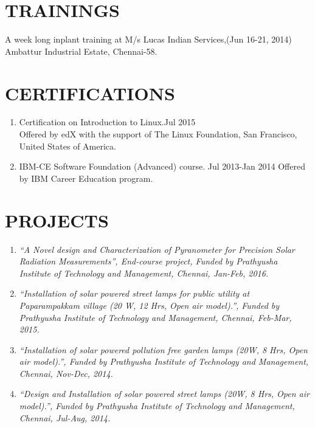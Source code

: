 \documentclass[line,margin,12pt ]{res}
\begin{document}
\begin{resume}

\section{TRAININGS }
A week long inplant training at M/s Lucas Indian Services,\hfill (Jun 16-21, 2014) \newline Ambattur Industrial Estate, Chennai-58. 


\section{CERTIFICATIONS}\vspace*{-0.48 cm}
\begin{enumerate}
    \item	{Certification on \textgravedbl Introduction to Linux.\textacutedbl }\hfill{Jul 2015}\\
Offered by edX with the support of The Linux Foundation, San Francisco, United States of America. 
	 \item {IBM-CE Software Foundation (Advanced) course. \hfill {Jul 2013-Jan 2014}}
\newline Offered by IBM Career Education program.
\end{enumerate}


\section{PROJECTS}\vspace*{-0.48 cm} %
\begin{enumerate}
\item {\sl \textquotedblleft A Novel design and Characterization of Pyranometer for Precision Solar Radiation Measurements\textquotedblright, End-course project, Funded by Prathyusha Institute of Technology and Management, Chennai, Jan-Feb, 2016.}
\item {\sl \textquotedblleft Installation of solar powered street lamps for public utility at Paparampakkam village (20 W, 12 Hrs, Open air model).\textquotedblright, Funded by Prathyusha Institute of Technology and Management, Chennai, Feb-Mar, 2015.}
\item {\sl \textquotedblleft Installation of solar powered pollution free garden lamps (20W, 8 Hrs, Open air model).\textquotedblright, Funded by Prathyusha Institute of Technology and Management, Chennai, Nov-Dec, 2014.}
\item {\sl \textquotedblleft Design and Installation of solar powered street lamps (20W, 8 Hrs, Open air model).\textquotedblright , Funded by Prathyusha Institute of Technology and Management, Chennai, Jul-Aug, 2014.}
\end{enumerate} 



\end{resume}
\end{document}
